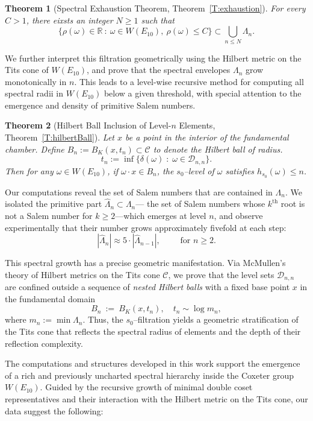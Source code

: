 \documentclass[11pt]{amsart}
\numberwithin{equation}{section}
\newtheorem*{thmm}{Theorem}
\begin{document}
\begin{thmm}[Spectral Exhaustion Theorem, Theorem~\ref{T:exhaustion}] For every $C >1$, there eixsts an integer $N\ge 1$ such that
\[ \{ \rho(\omega) \in \mathbb{R}\ :\ \omega \in W(E_{10}), \ \rho(\omega)\le C\} \subset \bigcup_{n\le N} \Lambda_n. \]
\end{thmm}


We further interpret this filtration geometrically using the Hilbert metric on the Tits cone of $W(E_{10})$, and prove that the spectral envelopes $\Lambda_n$  grow monotonically in $n$. This leads to a level-wise recursive method for computing all spectral radii in $W(E_{10})$ below a given threshold, with special attention to the emergence and density of primitive Salem numbers.

\begin{thmm}[Hilbert Ball Inclusion of Level-$n$ Elements, Theorem~\ref{T:hilbertBall}]
Let $x$ be a point in the interior of the fundamental chamber.
Define $B_n := B_K(x, t_n) \subset \mathcal{C}$ to denote the Hilbert ball of radius.
\[
t_n := \inf\bigl\{\delta(\omega) \;:\; \omega \in \mathcal{D}_{n,n}\bigr\}.
\]
Then for any $\omega \in W(E_{10})$, if $\omega \cdot x \in B_n$,
the $s_0$--level of $\omega$ satisfies $h_{s_0}(\omega) \le n$.
\end{thmm}

\medskip
Our computations reveal the set of Salem numbers that are contained in $\Lambda_n$. We isolated the primitive part $\hat \Lambda_n \subset \Lambda_n$--- the set of Salem numbers whose $k^\text{th}$ root is not a Salem number for $k\ge 2$---which emerges at level $n$, and observe experimentally that their number grows approximately fivefold at each step: 
\[ |\hat \Lambda_n| \approx 5 \cdot |\hat \Lambda_{n-1}|, \qquad \text{ for } n\ge 2.\]

This spectral growth has a precise geometric manifestation. Via McMullen's theory of Hilbert metrics on the Tits cone $\mathcal{C}$, we prove that the level sets $\mathcal{D}_{n,n}$ are confined outside a sequence of \emph{nested Hilbert balls} with a fixed base point $x$ in the fundamental domain 
\[ B_n \ :=\ B_K(x, t_n), \quad t_n \sim \log m_n,\]
where $m_n := \min \Lambda_n$. Thus, the $s_0$--filtration yields a geometric stratification of the Tits cone that reflects the spectral radius of elements and the depth of their reflection complexity. 


The computations and structures developed in this work support the emergence of a rich and previously uncharted spectral hierarchy inside the Coxeter group $W(E_{10})$. Guided by the recursive growth of minimal double coset representatives and their interaction with the Hilbert metric on the Tits cone, our data suggest the following:
\end{document}
